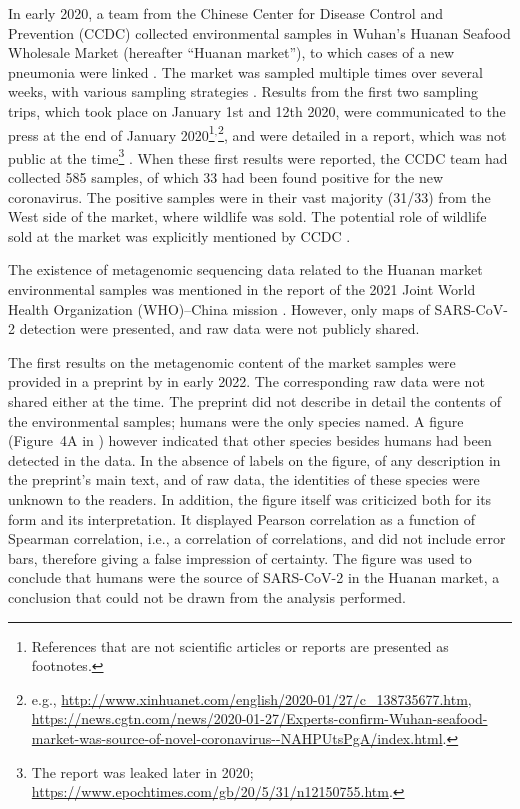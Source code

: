 \documentclass[11pt]{article}
\def \sct {\mbox{SARS-CoV-2}}
\begin{document}
In early 2020, a team from the Chinese Center for Disease Control and Prevention (CCDC) collected environmental samples in Wuhan’s Huanan Seafood Wholesale Market (hereafter ``Huanan market''), to which cases of a new pneumonia were linked \citep{Chen2020Lancet, Worobey2021Science}. The market was sampled multiple times over several weeks, with various sampling strategies \citep{WHO2021, Liu2023Nature}. Results from the first two sampling trips, which took place on January 1st and 12th 2020, were communicated to the press at the end of January 2020\footnote{References that are not scientific articles or reports are presented as footnotes.}$^,$\footnote{e.g., \url{http://www.xinhuanet.com/english/2020-01/27/c_138735677.htm}, \url{https://news.cgtn.com/news/2020-01-27/Experts-confirm-Wuhan-seafood-market-was-source-of-novel-coronavirus--NAHPUtsPgA/index.html}.}, and were detailed in a report, which was not public at the time\footnote{The report was leaked later in 2020; \url{https://www.epochtimes.com/gb/20/5/31/n12150755.htm}.} \citep{Wu2020CCDC}. When these first results were reported, the CCDC team had collected 585 samples, of which 33 had been found positive for the new coronavirus. The positive samples were in their vast majority (31/33) from the West side of the market, where wildlife was sold. The potential role of wildlife sold at the market was explicitly mentioned by CCDC \citep{Wu2020CCDC, Tan2020CCDC}. 

The existence of metagenomic sequencing data related to the Huanan market environmental samples was mentioned in the report of the 2021 Joint World Health Organization (WHO)--China mission \citep[p.97]{WHO2021}.  However, only maps of \sct{} detection were presented, and raw data were not publicly shared. 

The first results on the metagenomic content of the market samples were provided in a preprint by \citet{Liu2022RS} in early 2022. The corresponding raw data were not shared either at the time. The preprint did not describe in detail the contents of the environmental samples; humans were the only species named. A figure (Figure~4A in \citet{Liu2022RS}) however indicated that other species besides humans had been detected in the data. In the absence of labels on the figure, of any description in the preprint's main text, and of raw data, the identities of these species were unknown to the readers. In addition, the figure itself was criticized both for its form and its interpretation. It displayed Pearson correlation as a function of Spearman correlation, i.e., a correlation of correlations, and did not include error bars, therefore giving a false impression of certainty. The figure was used to conclude that humans were the source of \sct{} in the Huanan market, a conclusion that could not be drawn from the analysis performed. 
\end{document}
